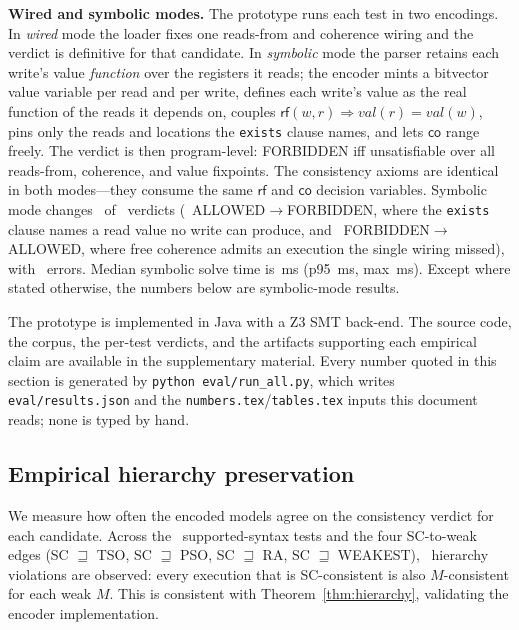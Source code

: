\documentclass{llncs}
\newcommand{\rf}{\mathsf{rf}}
\newcommand{\co}{\mathsf{co}}
\begin{document}
\noindent\textbf{Wired and symbolic modes.} The prototype runs each test in two
encodings. In \emph{wired} mode the loader fixes one reads-from and coherence
wiring and the verdict is definitive for that candidate. In \emph{symbolic} mode
the parser retains each write's value \emph{function} over the registers it reads;
the encoder mints a bitvector value variable per read and per write, defines each
write's value as the real function of the reads it depends on, couples
$\rf(w,r) \Rightarrow \mathit{val}(r) = \mathit{val}(w)$, pins only the reads and
locations the \texttt{exists} clause names, and lets $\co$ range freely. The verdict
is then program-level: FORBIDDEN iff unsatisfiable over all reads-from, coherence,
and value fixpoints. The consistency axioms are identical in both modes---they
consume the same $\rf$ and $\co$ decision variables. Symbolic mode changes
\SymbolicVerdictChanges~of \SymbolicCorpusTests~verdicts
(\SymbolicAllowedToForbidden~ALLOWED$\to$FORBIDDEN, where the \texttt{exists}
clause names a read value no write can produce, and
\SymbolicForbiddenToAllowed~FORBIDDEN$\to$ALLOWED, where free coherence admits an
execution the single wiring missed), with \SymbolicErrors~errors. Median symbolic
solve time is \MedianRuntimeMs\,ms (p95 \PNinetyFiveRuntimeMs\,ms, max
\MaxRuntimeMs\,ms). Except where stated otherwise, the numbers below are
symbolic-mode results.

The prototype is implemented in Java with a Z3 SMT back-end. The source code,
the corpus, the per-test verdicts, and the artifacts supporting each empirical
claim are available in the supplementary material. Every number quoted in this
section is generated by \texttt{python eval/run\_all.py}, which writes
\texttt{eval/results.json} and the \texttt{numbers.tex}/\texttt{tables.tex} inputs
this document reads; none is typed by hand.

\subsection{Empirical hierarchy preservation}
\label{sec:hierarchy-corollary}

We measure how often the encoded models agree on the consistency verdict for
each candidate. Across the \HierarchyTests~supported-syntax tests and the four
SC-to-weak edges (SC $\sqsupseteq$ TSO, SC $\sqsupseteq$ PSO, SC $\sqsupseteq$
RA, SC $\sqsupseteq$ WEAKEST), \HierarchyViolations~hierarchy violations are observed: every
execution that is SC-consistent is also $M$-consistent for each weak $M$.
This is consistent with Theorem~\ref{thm:hierarchy}, validating the encoder implementation. 
\end{document}
